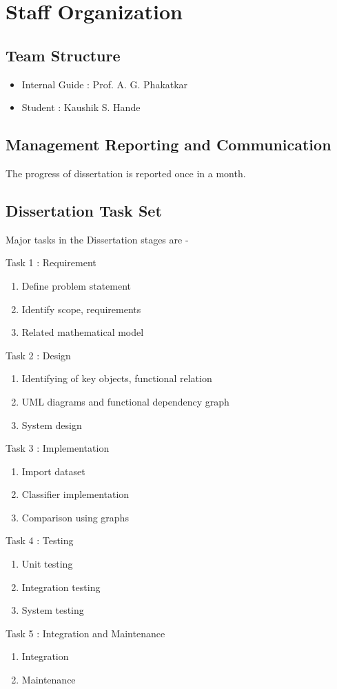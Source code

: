\documentclass[oneside,a4paper,12pt]{pictreport}
\begin{document}
\section{Staff Organization}

\subsection{Team Structure}
\begin{itemize}
    \item Internal Guide : Prof. A. G. Phakatkar
    \item Student : Kaushik S. Hande 
\end{itemize}

\subsection{Management Reporting and Communication}
The progress of dissertation is reported once in a month.
\subsection{Dissertation Task Set}


Major tasks in the Dissertation stages are - 
	
				
				Task 1 : Requirement
					\begin{enumerate}
						\item Define problem statement
						\item Identify scope, requirements
						\item Related mathematical model
					\end{enumerate}
				Task 2 : Design
					\begin{enumerate}
						\item Identifying of key objects, functional relation
						\item UML diagrams and functional dependency graph
						\item System design
					\end{enumerate}
				Task 3 : Implementation
				\begin{enumerate}
						\item Import dataset
						\item Classifier implementation
						\item Comparison using graphs
					\end{enumerate}
				Task 4 : Testing
					\begin{enumerate}
						\item Unit testing
						\item Integration testing
						\item System testing
					\end{enumerate}
				Task 5 : Integration and Maintenance
					\begin{enumerate}
						\item Integration
						\item Maintenance
					\end{enumerate}
\end{document}
